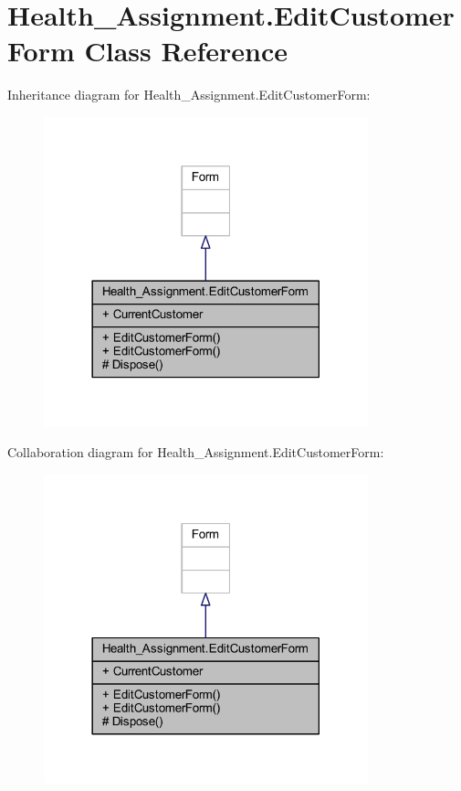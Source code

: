 \hypertarget{class_health___assignment_1_1_edit_customer_form}{}\section{Health\+\_\+\+Assignment.\+Edit\+Customer\+Form Class Reference}
\label{class_health___assignment_1_1_edit_customer_form}


Inheritance diagram for Health\+\_\+\+Assignment.\+Edit\+Customer\+Form\+:\nopagebreak
\begin{figure}[H]
\begin{center}
\leavevmode
\includegraphics[width=266pt]{class_health___assignment_1_1_edit_customer_form__inherit__graph}
\end{center}
\end{figure}


Collaboration diagram for Health\+\_\+\+Assignment.\+Edit\+Customer\+Form\+:\nopagebreak
\begin{figure}[H]
\begin{center}
\leavevmode
\includegraphics[width=266pt]{class_health___assignment_1_1_edit_customer_form__coll__graph}
\end{center}
\end{figure}
